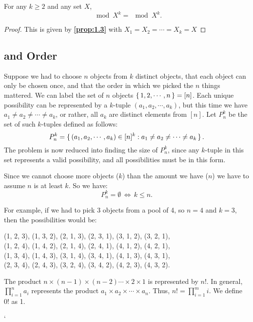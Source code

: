 \documentclass[a4paper]{article}
\begin{document}
	\begin{corollary}
		For any $k\geq 2$ and any set $X$, \[\mod{X^k} = \mod{X}^k.\]
	\end{corollary}
	
	\begin{proof}
		This is given by \textbf{\autoref{prop:1.3}} with $X_1 = X_2 = \cdots = X_k = X$
	\end{proof}
	
	\newpage
	
	\subsection{ and Order}
	
	Suppose we had to choose $n$ objects from $k$ distinct objects, that each object can only be chosen once, and that the order in which we picked the $n$ things mattered. We can label the set of $n$ objects $\set{1,2,\cdots,n} = [n]$. Each unique possibility can be represented by a $k$-tuple $(a_1, a_2, \cdots, a_k)$, but this time we have $a_1 \neq a_2 \neq \cdots \neq a_k$, or rather, all $a_k$ are distinct elements from $[n]$. Let $P^k_n$ be the set of such $k$-tuples defined as follows:	\[P^k_n = \set{(a_1, a_2, \cdots, a_k) \in [n]^k : a_1 \neq a_2 \neq \cdots \neq a_k}.\] The problem is now reduced into finding the size of $P^k_n$, since any $k$-tuple in this set represents a valid possibility, and all possibilities must be in this form.
	
	\begin{note}
		Since we cannot choose more objects ($k$) than the amount we have ($n$) we have to assume $n$ is at least $k$. So we have: \[P^k_n = \emptyset \, \iff \, k \leq n.\]
	\end{note}
	
	For example, if we had to pick 3 objects from a pool of 4, so $n=4$ and $k=3$, then the possibilities would be:
	
	\begin{center}
		(1, 2, 3), (1, 3, 2), (2, 1, 3), (2, 3, 1), (3, 1, 2), (3, 2, 1),\\
		(1, 2, 4), (1, 4, 2), (2, 1, 4), (2, 4, 1), (4, 1, 2), (4, 2, 1),\\
		(1, 3, 4), (1, 4, 3), (3, 1, 4), (3, 4, 1), (4, 1, 3), (4, 3, 1),\\
		(2, 3, 4), (2, 4, 3), (3, 2, 4), (3, 4, 2), (4, 2, 3), (4, 3, 2).
	\end{center}

	\begin{recall}
		The product $n\times (n-1) \times (n-2) \cdots \times 2 \times 1$ is represented by $n!$. In general, $\prod_{i=1}^n a_i$ represents the product $a_1 \times a_2 \times \cdots \times a_n$. Thus, $n! = \prod_{i=1}^m i$. We define $0!$ as 1.
	\end{recall}`
	
\end{document}
